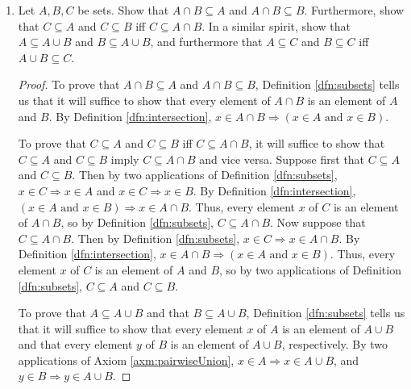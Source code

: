\documentclass[../main.tex]{subfiles}
\begin{document}
\begin{enumerate}[ref={\thesection.\arabic*}]
\begin{prp}
\begin{enumerate}[label={\textup{(}\alph*\textup{)}},ref={\theenumi\alph*}]
\begin{proof}
            \end{proof}
        \end{enumerate}
    \end{prp}
    \item \label{exr:3.1.7}Let $A,B,C$ be sets. Show that $A\cap B\subseteq A$ and $A\cap B\subseteq B$. Furthermore, show that $C\subseteq A$ and $C\subseteq B$ iff $C\subseteq A\cap B$. In a similar spirit, show that $A\subseteq A\cup B$ and $B\subseteq A\cup B$, and furthermore that $A\subseteq C$ and $B\subseteq C$ iff $A\cup B\subseteq C$.
    \begin{proof}
        To prove that $A\cap B\subseteq A$ and $A\cap B\subseteq B$, Definition \ref{dfn:subsets} tells us that it will suffice to show that every element of $A\cap B$ is an element of $A$ and $B$. By Definition \ref{dfn:intersection}, $x\in A\cap B \Longrightarrow (x\in A\text{ and }x\in B)$.\par
        To prove that $C\subseteq A$ and $C\subseteq B$ iff $C\subseteq A\cap B$, it will suffice to show that $C\subseteq A$ and $C\subseteq B$ imply $C\subseteq A\cap B$ and vice versa. Suppose first that $C\subseteq A$ and $C\subseteq B$. Then by two applications of Definition \ref{dfn:subsets}, $x\in C \Longrightarrow x\in A$ and $x\in C \Longrightarrow x\in B$. By Definition \ref{dfn:intersection}, $(x\in A\text{ and }x\in B) \Longrightarrow x\in A\cap B$. Thus, every element $x$ of $C$ is an element of $A\cap B$, so by Definition \ref{dfn:subsets}, $C\subseteq A\cap B$. Now suppose that $C\subseteq A\cap B$. Then by Definition \ref{dfn:subsets}, $x\in C \Longrightarrow x\in A\cap B$. By Definition \ref{dfn:intersection}, $x\in A\cap B \Longrightarrow (x\in A\text{ and }x\in B)$. Thus, every element $x$ of $C$ is an element of $A$ and $B$, so by two applications of Definition \ref{dfn:subsets}, $C\subseteq A$ and $C\subseteq B$.\par
        To prove that $A\subseteq A\cup B$ and that $B\subseteq A\cup B$, Definition \ref{dfn:subsets} tells us that it will suffice to show that every element $x$ of $A$ is an element of $A\cup B$ and that every element $y$ of $B$ is an element of $A\cup B$, respectively. By two applications of Axiom \ref{axm:pairwiseUnion}, $x\in A \Longrightarrow x\in A\cup B$, and $y\in B \Longrightarrow y\in A\cup B$.\par

\end{proof}
\end{enumerate}
\end{document}
